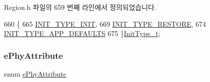 Region.\+h 파일의 659 번째 라인에서 정의되었습니다.


\begin{DoxyCode}
660 \{
665     \mbox{\hyperlink{group___r_e_g_i_o_n_gga11ecad794560a3d3961bdf1c9a27d3b2a5065ce7a587a2aeff0da16507222c4d7}{INIT\_TYPE\_INIT}},
669     \mbox{\hyperlink{group___r_e_g_i_o_n_gga11ecad794560a3d3961bdf1c9a27d3b2aed3218cb3c4ebbb74a1b48e4f8ac8599}{INIT\_TYPE\_RESTORE}},
674     \mbox{\hyperlink{group___r_e_g_i_o_n_gga11ecad794560a3d3961bdf1c9a27d3b2a3d260b94611dd833c5243c16ca26c3f0}{INIT\_TYPE\_APP\_DEFAULTS}}
675 \}\mbox{\hyperlink{group___r_e_g_i_o_n_gaddc73ae10673ec925724e7870363bda9}{InitType\_t}};
\end{DoxyCode}
\mbox{\label{group___r_e_g_i_o_n_ga51cbe8f5433d914fe9cf81b451de2c2d}} 
\subsubsection{\texorpdfstring{e\+Phy\+Attribute}{ePhyAttribute}}
{\footnotesize\ttfamily enum \mbox{\hyperlink{group___r_e_g_i_o_n_ga51cbe8f5433d914fe9cf81b451de2c2d}{e\+Phy\+Attribute}}}

